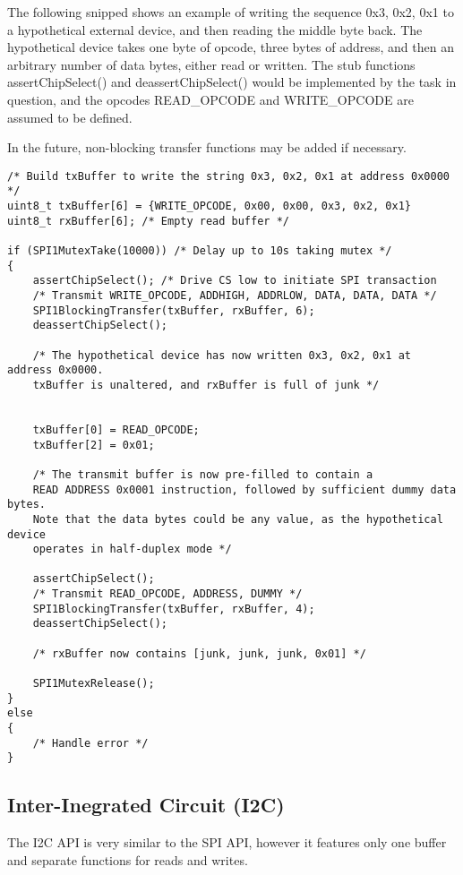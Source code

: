 \documentclass{article}
\begin{document}
The following snipped shows an example of writing the sequence 0x3, 0x2, 0x1 to
a hypothetical external device, and then reading the middle byte back.
The hypothetical device takes one byte of opcode, three bytes of address, and then
an arbitrary number of data bytes, either read or written.
The stub functions
assertChipSelect() and deassertChipSelect() would be implemented by the task in question,
and the opcodes READ\_OPCODE and WRITE\_OPCODE are assumed to be defined.

In the future, non-blocking transfer functions may be added if necessary.

\begin{verbatim}
/* Build txBuffer to write the string 0x3, 0x2, 0x1 at address 0x0000 */
uint8_t txBuffer[6] = {WRITE_OPCODE, 0x00, 0x00, 0x3, 0x2, 0x1}
uint8_t rxBuffer[6]; /* Empty read buffer */

if (SPI1MutexTake(10000)) /* Delay up to 10s taking mutex */
{  
    assertChipSelect(); /* Drive CS low to initiate SPI transaction
    /* Transmit WRITE_OPCODE, ADDHIGH, ADDRLOW, DATA, DATA, DATA */
    SPI1BlockingTransfer(txBuffer, rxBuffer, 6);
    deassertChipSelect();
    
    /* The hypothetical device has now written 0x3, 0x2, 0x1 at address 0x0000.
    txBuffer is unaltered, and rxBuffer is full of junk */
    
    
    txBuffer[0] = READ_OPCODE;
    txBuffer[2] = 0x01;
    
    /* The transmit buffer is now pre-filled to contain a 
    READ ADDRESS 0x0001 instruction, followed by sufficient dummy data bytes. 
    Note that the data bytes could be any value, as the hypothetical device 
    operates in half-duplex mode */
    
    assertChipSelect();
    /* Transmit READ_OPCODE, ADDRESS, DUMMY */
    SPI1BlockingTransfer(txBuffer, rxBuffer, 4);
    deassertChipSelect();
    
    /* rxBuffer now contains [junk, junk, junk, 0x01] */
    
    SPI1MutexRelease();
}
else
{
    /* Handle error */
}

\end{verbatim}
\clearpage


\subsection{Inter-Inegrated Circuit (I2C)}
The I2C API is very similar to the SPI API, however it features only one buffer
and separate functions for reads and writes.
\end{document}
